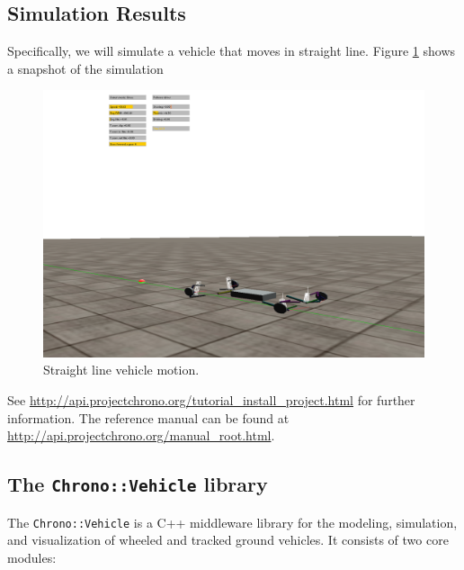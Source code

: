 \subsection{Simulation Results}

 
Specifically, we will simulate a vehicle that moves in straight line.  Figure \ref{straight_line_motion} shows a snapshot of the simulation

\begin{figure}[!htb]
\begin{center}
\includegraphics[scale=0.290]{img/straight_line_motion.png}
\end{center}
\caption{Straight line vehicle motion.}
\label{straight_line_motion}
\end{figure}

See \url{http://api.projectchrono.org/tutorial_install_project.html} for further information. The reference manual can be found at
\url{http://api.projectchrono.org/manual_root.html}.

\subsection{The \lstinline{Chrono::Vehicle} library}

The \lstinline{Chrono::Vehicle} is a C++ middleware library for the modeling, simulation, and visualization of wheeled and tracked ground vehicles.
It consists of two core modules:

